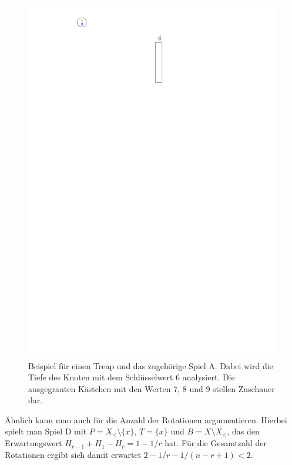 \documentclass[a4paper]{scrreprt}
\theoremstyle{definition}
\begin{document}
\begin{figure}
    \centering
    \includegraphics[page=10,width=\textwidth]{img/Laufzeit_Beweis.pdf}
    \caption[Beispiel: Treap mit Spiel A]{Beispiel für einen Treap und das zugehörige Spiel A.
    Dabei wird die Tiefe des Knoten mit dem Schlüsselwert $6$ analysiert.
    Die ausgegrauten Kästchen mit den Werten $7$, $8$ und $9$ stellen Zuschauer dar.}
    \label{fig:proofgamea}
\end{figure}
Ähnlich kann man auch für die Anzahl der Rotationen argumentieren.
Hierbei spielt man Spiel D mit $P = X_\leq \setminus \{x\}$, $T = \{x\}$ und $B = X \setminus X_\leq$, das den Erwartungswert $H_{r-1} + H_1 - H_r = 1 - 1/r$ hat.
Für die Gesamtzahl der Rotationen ergibt sich damit erwartet $2 - 1/r - 1/(n-r+1) < 2$.
\end{document}

